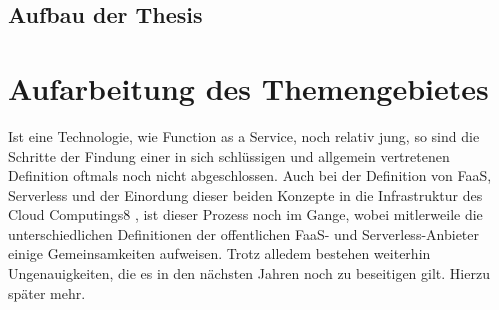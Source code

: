 \documentclass[11pt]{article}
\begin{document}
\subsection{Aufbau der Thesis}










\section{Aufarbeitung des Themengebietes}
Ist eine Technologie, wie Function as a Service, noch relativ jung, so sind die Schritte der Findung einer in sich schlüssigen und allgemein vertretenen Definition oftmals noch nicht abgeschlossen. Auch bei der Definition von FaaS, Serverless und der Einordung dieser beiden Konzepte in die Infrastruktur des Cloud Computings8  \cite{mell2011nist}, ist dieser Prozess noch im Gange, wobei mitlerweile die unterschiedlichen Definitionen der offentlichen FaaS- und Serverless-Anbieter einige Gemeinsamkeiten aufweisen. Trotz alledem bestehen weiterhin Ungenauigkeiten, die es in den nächsten Jahren noch zu beseitigen gilt. Hierzu später mehr. \\\\
\end{document}
